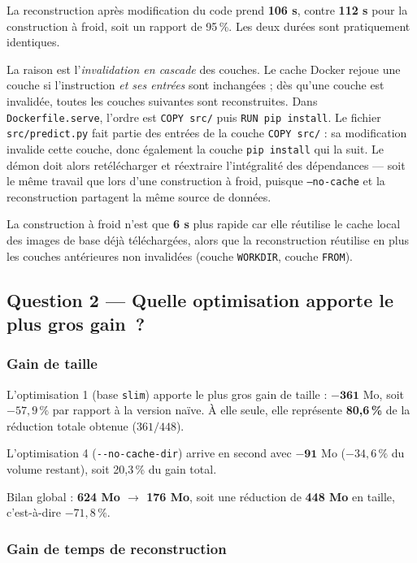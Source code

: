 \documentclass[11pt,a4paper]{report}
\newcommand{\num}[1]{\textbf{#1}}
\begin{document}
La reconstruction après modification du code prend \num{106 s}, contre
\num{112 s} pour la construction à froid, soit un rapport de 95\,\%. Les deux
durées sont pratiquement identiques.

La raison est l'\emph{invalidation en cascade} des couches. Le cache Docker
rejoue une couche si l'instruction \emph{et ses entrées} sont inchangées ; dès
qu'une couche est invalidée, toutes les couches suivantes sont reconstruites.
Dans \texttt{Dockerfile.serve}, l'ordre est
\texttt{COPY src/} puis \texttt{RUN pip install}. Le fichier
\texttt{src/predict.py} fait partie des entrées de la couche \texttt{COPY
src/} : sa modification invalide cette couche, donc également la couche
\texttt{pip install} qui la suit. Le démon doit alors retélécharger et
réextraire l'intégralité des dépendances --- soit le même travail que lors
d'une construction à froid, puisque \texttt{--no-cache} et la reconstruction
partagent la même source de données.

La construction à froid n'est que \num{6 s} plus rapide car elle réutilise le
cache local des images de base déjà téléchargées, alors que la reconstruction
réutilise en plus les couches antérieures non invalidées (couche
\texttt{WORKDIR}, couche \texttt{FROM}).

\subsection{Question 2 --- Quelle optimisation apporte le plus gros gain~?}
\label{sec:q2}

\subsubsection{Gain de taille}

L'optimisation 1 (base \texttt{slim}) apporte le plus gros gain de taille :
$-\num{361}$ Mo, soit $-57{,}9\,\%$ par rapport à la version naïve. À elle
seule, elle représente \textbf{80,6\,\%} de la réduction totale obtenue
($361/448$).

L'optimisation 4 (\texttt{-{}-no-cache-dir}) arrive en second avec
$-\num{91}$ Mo ($-34,6\,\%$ du volume restant), soit 20,3\,\% du gain total.

Bilan global : \textbf{624 Mo $\rightarrow$ 176 Mo}, soit une réduction de
\num{448 Mo} en taille, c'est-à-dire \textbf{$-71,8\,\%$}.

\subsubsection{Gain de temps de reconstruction}
\end{document}
